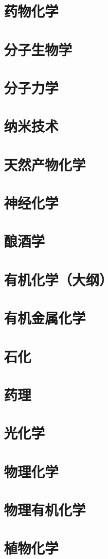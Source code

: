 \section{药物化学}
\section{分子生物学}
\section{分子力学}
\section{纳米技术}
\section{天然产物化学}
\section{神经化学}
\section{酿酒学}
\section{有机化学（大纲）}
\section{有机金属化学}
\section{石化}
\section{药理}
\section{光化学}
\section{物理化学}
\section{物理有机化学}
\section{植物化学}
